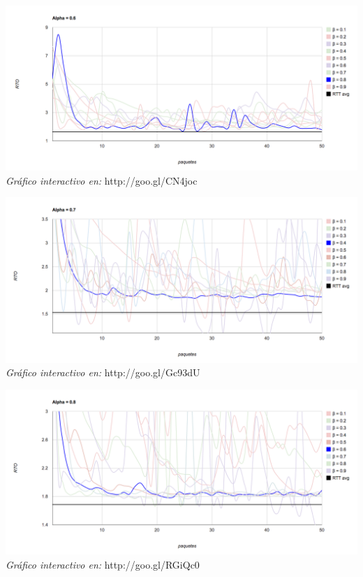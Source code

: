 \begin{center}
	\includegraphics[scale=0.35]{graphics/rto_vs_paquetes_a_6.png}
	\textit{Gráfico interactivo en:} http://goo.gl/CN4joc
\end{center}


\begin{center}
	\includegraphics[scale=0.35]{graphics/rto_vs_paquetes_a_7.png}
	\textit{Gráfico interactivo en:} http://goo.gl/Gc93dU
\end{center}

\begin{center}
	\includegraphics[scale=0.35]{graphics/rto_vs_paquetes_a_8.png}
	\textit{Gráfico interactivo en:} http://goo.gl/RGiQc0
\end{center}

